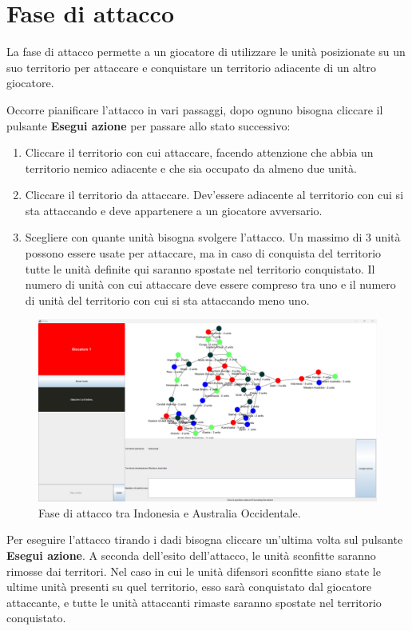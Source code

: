 \documentclass[a4paper,12pt]{report}
\begin{document}
\section{Fase di attacco}
La fase di attacco permette a un giocatore di utilizzare le unità posizionate su un suo territorio per attaccare e conquistare un territorio adiacente di un altro giocatore.

Occorre pianificare l'attacco in vari passaggi, dopo ognuno bisogna cliccare il pulsante \textbf{Esegui azione} per passare allo stato successivo:
\begin{enumerate}
	\item Cliccare il territorio con cui attaccare, facendo attenzione che abbia un territorio nemico adiacente e che sia occupato da almeno due unità.
	\item Cliccare il territorio da attaccare. Dev'essere adiacente al territorio con cui si sta attaccando e deve appartenere a un giocatore avversario.
	\item Scegliere con quante unità bisogna svolgere l'attacco. Un massimo di 3 unità possono essere usate per attaccare, ma in caso di conquista del territorio tutte le unità definite qui saranno spostate nel territorio conquistato. Il numero di unità con cui attaccare deve essere compreso tra uno e il numero di unità del territorio con cui si sta attaccando meno uno.
\end{enumerate}

\begin{figure}[H]
	\centering
	\includegraphics[width=1\textwidth]{user_guide/9_excecuting attack.png}
	\caption{Fase di attacco tra Indonesia e Australia Occidentale.}
\end{figure}

Per eseguire l'attacco tirando i dadi bisogna cliccare un'ultima volta sul pulsante \textbf{Esegui azione}.
A seconda dell'esito dell'attacco, le unità sconfitte saranno rimosse dai territori.
Nel caso in cui le unità difensori sconfitte siano state le ultime unità presenti su quel territorio, esso sarà conquistato dal giocatore attaccante, e tutte le unità attaccanti rimaste saranno spostate nel territorio conquistato.
\end{document}
